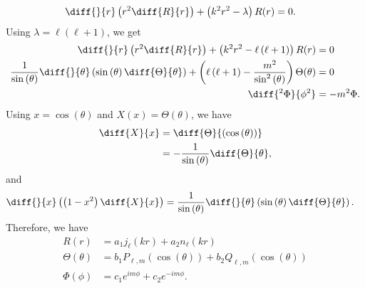 \documentclass[10pt]{mypackage}
\begin{document}
\begin{solution}[41.8]
\begin{align*}
    \diff{}{r}\left( r^2\diff{R}{r} \right) + \left( k^2r^2 - \lambda \right)R(r) &= 0.
  \end{align*}
  Using $\lambda = \ell\left( \ell + 1 \right)$, we get
  \begin{align*}
    \diff{}{r}\left( r^2\diff{R}{r} \right) + \left( k^2r^2 - \ell\left( \ell + 1 \right) \right)R(r) &= 0\\
    \frac{1}{\sin\left( \theta \right)}\diff{}{\theta}\left( \sin\left( \theta \right)\diff{\Theta}{\theta} \right) + \left( \ell\left( \ell + 1 \right) - \frac{m^2}{\sin^2\left( \theta \right)} \right)\Theta(\theta) &= 0\\
    \diff{^2\Phi}{\phi^2} &= -m^2\Phi.
  \end{align*}
  Using $x = \cos\left( \theta \right)$ and $X(x) = \Theta(\theta)$, we have
  \begin{align*}
    \diff{X}{x} &= \diff{\Theta}{\left( \cos\left( \theta \right) \right)}\\
                &= -\frac{1}{\sin\left( \theta \right)} \diff{\Theta}{\theta},
  \end{align*}
  and
  \begin{align*}
    \diff{}{x}\left( \left( 1-x^2 \right)\diff{X}{x} \right) &= \frac{1}{\sin\left( \theta \right)}\diff{}{\theta}\left( \sin\left( \theta \right)\diff{\Theta}{\theta} \right).
  \end{align*}
  Therefore, we have
  \begin{align*}
    R(r) &= a_1j_{\ell}\left( kr \right) + a_2n_{\ell}\left( kr \right)\\
    \Theta(\theta) &= b_1P_{\ell,m}\left( \cos\left( \theta \right) \right) + b_2Q_{\ell,m}\left( \cos\left( \theta \right) \right)\\
    \Phi(\phi) &= c_1e^{im\phi} + c_2e^{-im\phi}.
  \end{align*}
\end{solution}
\begin{solution}[41.13]

\end{solution}
\begin{solution}[41.14]

\end{solution}
\begin{solution}[41.16]

\end{solution}
\begin{solution}[41.25]

\end{solution}
\begin{solution}[41.28]

\end{solution}
\begin{solution}[42.1]

\end{solution}
\begin{solution}[42.2]

\end{solution}
\begin{solution}[42.11]

\end{solution}
\end{document}
